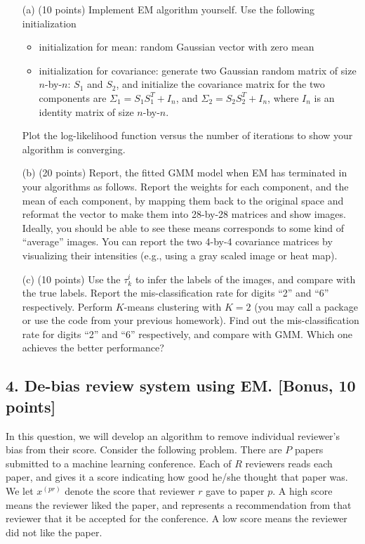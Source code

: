 \documentclass[12pt]{article}
\begin{document}
\begin{enumerate}


\item[(a)] (10 points) Implement EM algorithm yourself. Use the following initialization
\begin{itemize}
\item initialization for mean: random Gaussian vector with zero mean
\item initialization for covariance: generate two Gaussian random matrix of size $n$-by-$n$: $S_1$ and $S_2$, and initialize the covariance matrix for the two components are $\Sigma_1 = S_1 S_1^T + I_n$, and  $\Sigma_2 = S_2 S_2^T + I_n$, where $I_n$ is an identity matrix of size $n$-by-$n$. 
\end{itemize}
Plot the log-likelihood function versus the number of iterations to show your algorithm is converging.

\item[(b)] (20 points) Report, the fitted GMM model when EM has terminated in your algorithms as follows. Report the weights for each component, and the mean of each component, by mapping them back to the original space and reformat the vector to make them into 28-by-28 matrices and show images. Ideally, you should be able to see these means corresponds to some kind of ``average'' images.  You can report the two 4-by-4 covariance matrices by visualizing their intensities (e.g., using a gray scaled image or heat map). 

\item[(c)] (10 points) Use the $\tau_{k}^i$ to infer the labels of the images, and compare with the true labels. Report the mis-classification rate for digits ``2'' and ``6'' respectively. Perform $K$-means clustering with $K=2$ (you may call a package or use the code from your previous homework). Find out the  mis-classification rate for digits ``2'' and ``6'' respectively, and compare with GMM. Which one achieves the better performance?

\end{enumerate}





\subsection*{4. De-bias review system using EM. [Bonus, 10 points]} 

In this question, we will develop an algorithm to remove individual reviewer's bias from their score. Consider the following problem. There are $P$ papers submitted to a machine learning conference. Each of $R$ reviewers reads each paper, and gives it a score indicating how good he/she thought that paper was. We let $x^{(pr)}$ denote the score that reviewer $r$ gave to paper $p$. A high score means the reviewer liked the paper, and represents a recommendation from that reviewer that it be accepted for the conference. A low score means the reviewer did not like the paper.
\end{document}
